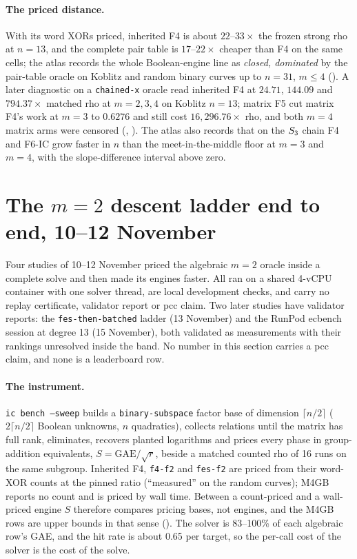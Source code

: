 \paragraph{The priced distance.} With its word XORs priced, inherited F4 is
about $22$--$33\times$ the frozen strong rho at $n=13$, and the complete pair table
is $17$--$22\times$ cheaper than F4 on the same cells; the atlas records the
whole Boolean-engine line as \emph{closed, dominated} by the pair-table
oracle on Koblitz and random binary curves up to $n=31$, $m\le4$
().
A later diagnostic on a \texttt{chained-x} oracle read inherited F4 at
$24.71$, $144.09$ and $794.37\times$ matched rho at $m=2,3,4$ on Koblitz
$n=13$; matrix F5 cut matrix F4's work at $m=3$ to $0.6276$ and still cost
$16{,}296.76\times$ rho, and both $m=4$ matrix arms were censored
(,
). The atlas also
records that on the $S_{3}$ chain F4 and F6-IC grow faster in $n$ than the
meet-in-the-middle floor at $m=3$ and $m=4$, with the slope-difference
interval above zero.

\section{The $m=2$ descent ladder end to end, 10--12 November}\label{sec:bo-ladder}

Four studies of 10--12 November priced the algebraic $m=2$ oracle inside a
complete solve and then made its engines faster. All ran on a shared
4-vCPU container with one solver thread, are local development checks,
and carry no replay certificate, validator report or pcc claim. Two later
studies have validator reports: the \texttt{fes-then-batched} ladder
(13 November) and the RunPod ecbench session at degree 13 (15 November),
both validated as measurements with their rankings unresolved inside the
band. No number in this section carries a pcc claim, and none is a
leaderboard row.

\paragraph{The instrument.} \texttt{ic bench --sweep} builds a
\texttt{binary-subspace} factor base of dimension $\lceil n/2\rceil$
($2\lceil n/2\rceil$ Boolean unknowns, $n$ quadratics), collects relations
until the matrix has full rank, eliminates, recovers planted logarithms and
prices every phase in group-addition equivalents, $S=\text{GAE}/\sqrt r$,
beside a matched counted rho of 16 runs on the same subgroup. Inherited F4,
\texttt{f4-f2} and \texttt{fes-f2} are priced from their word-XOR counts at
the pinned ratio (``measured'' on the random curves); M4GB reports no count
and is priced by wall time. Between a count-priced and a wall-priced engine
$S$ therefore compares pricing bases, not engines, and the M4GB rows are
upper bounds in that sense ().
The solver is 83--100\% of each algebraic row's GAE, and the hit rate is
about 0.65 per target, so the per-call cost of the solver is the cost of the
solve.

